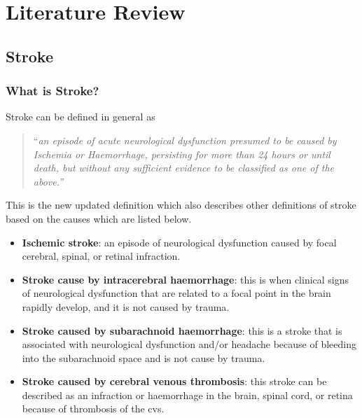 
\chapter{Literature Review}\label{Ch:2}
\vspace{30pt}


\section{Stroke}\label{sec:Stroke}
\subsection{What is Stroke?}\label{stroke?}
Stroke can be defined in general as \begin{quotation}
	
	“\textit{an episode of acute neurological dysfunction presumed to be caused by Ischemia or Haemorrhage, persisting for more than 24 hours or until death, but without any sufficient evidence to be classified as one of the above.”}\\
	\begin{flushright}
		\cite{Sacco2013}
	\end{flushright}
\end{quotation}
This is the new updated definition which also describes other definitions of stroke based on the causes which are listed below. 
\begin{itemize}%
	\item \textbf{Ischemic stroke}: an episode of neurological dysfunction caused by focal cerebral, spinal, or retinal infraction.
	\item \textbf{Stroke cause by intracerebral haemorrhage}: this is when clinical signs of neurological dysfunction that are related to a focal point in the brain rapidly develop, and it is not caused by trauma.
	\item \textbf{Stroke caused by subarachnoid haemorrhage}: this is a stroke that is associated with neurological dysfunction and/or headache because of bleeding into the subarachnoid space and is not cause by trauma.
	\item \textbf{Stroke caused by cerebral venous thrombosis}: this stroke can be described as an infraction or haemorrhage in the brain, spinal cord, or retina because of thrombosis of the \ac{cvs}. 
\end{itemize}

